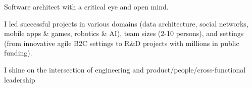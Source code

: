 


\begin{cvparagraph}

Software architect with a critical eye and open mind.

I led successful projects in various domains (data architecture, social networks, mobile apps \& games, robotics \& AI), team sizes (2-10 persons), and settings (from innovative agile B2C settings to R\&D projects with millions in public funding). 

I shine on the intersection of engineering and product/people/cross-functional leadership 

\end{cvparagraph}
